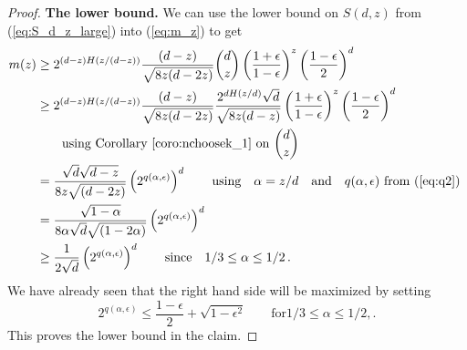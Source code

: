 \begin{proof}
\textbf{The lower bound.} We can use the lower bound on $S(d, z)$ from (\ref{eq:S_d_z_large}) into (\ref{eq:m_z}) to get
\begin{align*}
m(z) 
&\geq 2^{(d-z)H(z/(d- z))}\frac{(d-z)}{\sqrt{8z(d-2z)}} 
{d \choose z} \left(\frac{1+\epsilon}{1-\epsilon}\right)^{z} 
\left(\frac{1-\epsilon}{2}\right)^{d} \\
&\geq 2^{(d-z)H(z/(d- z))}\frac{(d-z)}{\sqrt{8z(d-2z)} } \frac{2^{d H(z/d)} \sqrt{d}}{\sqrt{8z(d-z)} }
\left(\frac{1+\epsilon}{1-\epsilon}\right)^{z} \left(\frac{1-\epsilon}{2}\right)^{d} \\
&\qquad \text{using Corollary~\ref{coro:nchoosek_1} on }{d \choose z}\\
&= \frac{\sqrt{d} \sqrt{d-z}}{8z\sqrt{(d-2z)} } 
\left( 2^{q(\alpha, \epsilon)}\right)^{d} \qquad \text{using}\quad \alpha = z/d \quad \text{and} \quad q(\alpha, \epsilon) \text{ from (\ref{eq:q2}) }\\
&= \frac{\sqrt{1-\alpha}}{8\alpha \sqrt{d} \sqrt{(1-2\alpha)} } 
\left( 2^{q(\alpha, \epsilon)}\right)^{d} \\
&\geq \frac{1}{2\sqrt{d}} 
\left( 2^{q(\alpha, \epsilon)}\right)^{d} \qquad \text{since}\quad 1/3 \leq \alpha \leq 1/2\, .
\end{align*}
We have already seen that the right hand side will be maximized by setting
\[
2^{q(\alpha, \epsilon)} \leq \frac{1-\epsilon}{2} + \sqrt{1-\epsilon^2} \qquad \text{for} 1/3 \leq \alpha \leq 1/2, .
\]
This proves the lower bound in the claim.
\end{proof}